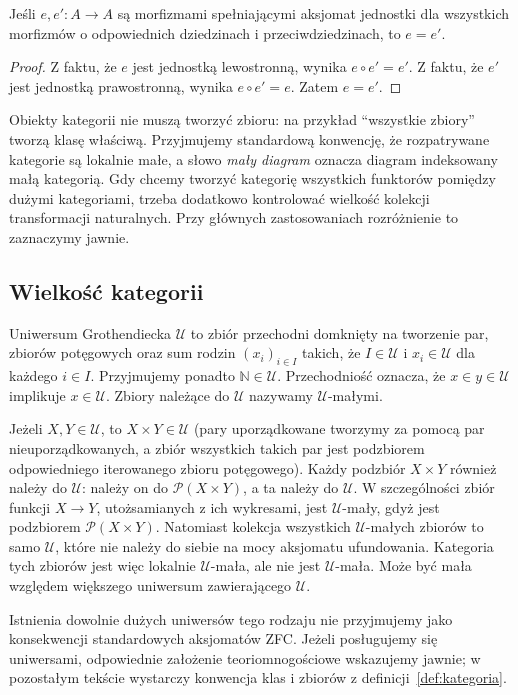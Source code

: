 \begin{lemat}
Jeśli $e,e':A\to A$ są morfizmami spełniającymi aksjomat jednostki dla wszystkich morfizmów o odpowiednich dziedzinach i przeciwdziedzinach, to $e=e'$.
\end{lemat}
\begin{proof}
Z faktu, że $e$ jest jednostką lewostronną, wynika $e\circ e'=e'$. Z faktu, że $e'$ jest jednostką prawostronną, wynika $e\circ e'=e$. Zatem $e=e'$.
\end{proof}


\begin{uwaga}
Obiekty kategorii nie muszą tworzyć zbioru: na przykład ``wszystkie zbiory'' tworzą klasę właściwą. Przyjmujemy standardową konwencję, że rozpatrywane kategorie są lokalnie małe, a słowo \emph{mały diagram} oznacza diagram indeksowany małą kategorią. Gdy chcemy tworzyć kategorię wszystkich funktorów pomiędzy dużymi kategoriami, trzeba dodatkowo kontrolować wielkość kolekcji transformacji naturalnych. Przy głównych zastosowaniach rozróżnienie to zaznaczymy jawnie.
\end{uwaga}


\subsection{Wielkość kategorii}

\begin{definicja}\label{cat:def:uniwersum}
Uniwersum Grothendiecka $\mathcal U$ to zbiór przechodni domknięty na tworzenie par, zbiorów potęgowych oraz sum rodzin $(x_i)_{i\in I}$ takich, że $I\in\mathcal U$ i $x_i\in\mathcal U$ dla każdego $i\in I$. Przyjmujemy ponadto $\mathbb N\in\mathcal U$. Przechodniość oznacza, że $x\in y\in\mathcal U$ implikuje $x\in\mathcal U$. Zbiory należące do $\mathcal U$ nazywamy $\mathcal U$-małymi.
\end{definicja}

\begin{uwaga}\label{cat:rem:uniwersa}
Jeżeli $X,Y\in\mathcal U$, to $X\times Y\in\mathcal U$ (pary uporządkowane tworzymy za pomocą par nieuporządkowanych, a zbiór wszystkich takich par jest podzbiorem odpowiedniego iterowanego zbioru potęgowego). Każdy podzbiór $X\times Y$ również należy do $\mathcal U$: należy on do $\mathcal P(X\times Y)$, a ta należy do $\mathcal U$. W szczególności zbiór funkcji $X\to Y$, utożsamianych z ich wykresami, jest $\mathcal U$-mały, gdyż jest podzbiorem $\mathcal P(X\times Y)$. Natomiast kolekcja wszystkich $\mathcal U$-małych zbiorów to samo $\mathcal U$, które nie należy do siebie na mocy aksjomatu ufundowania. Kategoria tych zbiorów jest więc lokalnie $\mathcal U$-mała, ale nie jest $\mathcal U$-mała. Może być mała względem większego uniwersum zawierającego $\mathcal U$.

Istnienia dowolnie dużych uniwersów tego rodzaju nie przyjmujemy jako konsekwencji standardowych aksjomatów ZFC. Jeżeli posługujemy się uniwersami, odpowiednie założenie teoriomnogościowe wskazujemy jawnie; w pozostałym tekście wystarczy konwencja klas i zbiorów z definicji~\ref{def:kategoria}.
\end{uwaga}

